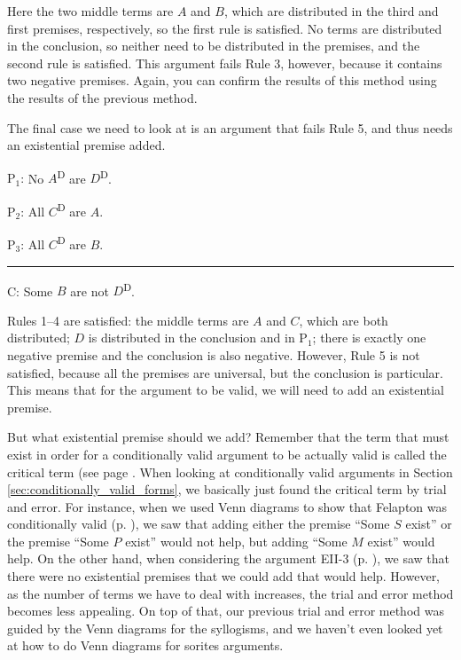 {Here the two middle terms are $A$ and $B$, which are distributed in the third and first premises, respectively, so the first rule is satisfied. No terms are distributed in the conclusion, so neither need to be distributed in the premises, and the second rule is satisfied. This argument fails Rule 3, however, because it contains two negative premises. Again, you can confirm the results of this method using the results of the previous method. 

The final case we need to look at is an argument that fails Rule 5, and thus needs an existential premise added. 

\begin{earg}
\item[P$_1$:] No $A$\textsuperscript{D} are $D$\textsuperscript{D}. 
\item[P$_2$:] All $C$\textsuperscript{D} are $A$.  %
\item[P$_3$:] All $C$\textsuperscript{D} are $B$. 
\vspace{-.5em}
\item [] \rule{0.3\linewidth}{.5pt} 
\item[C:] Some $B$ are not $D$\textsuperscript{D}. %
\end{earg} 

Rules 1--4 are satisfied: the middle terms are $A$ and $C$, which are both distributed; $D$ is distributed in the conclusion and in P$_1$; there is exactly one negative premise and the conclusion is also negative. However, Rule 5 is not satisfied, because all the premises are universal, but the conclusion is particular. This means that for the argument to be valid, we will need to add an existential premise. 

But what existential premise should we add? Remember that the term that must exist in order for a conditionally valid argument to be actually valid is called the critical term (see page \pageref{def:critical_term}. When looking at conditionally valid arguments in Section \ref{sec:conditionally_valid_forms}, we basically just found the critical term by trial and error. For instance, when we used Venn diagrams to show that Felapton was conditionally valid (p. \pageref{CVFex2}), we saw that adding either the premise ``Some $S$ exist'' or the premise ``Some $P$ exist'' would not help, but adding ``Some $M$ exist'' would help. On the other hand, when considering the argument EII-3 (p. \pageref{CVFex3}), we saw that there were no existential premises that we could add that would help. However, as the number of terms we have to deal with increases, the trial and error method becomes less appealing. On top of that, our previous trial and error method was guided by the Venn diagrams for the syllogisms, and we haven't even looked yet at how to do Venn diagrams for sorites arguments. 


}
